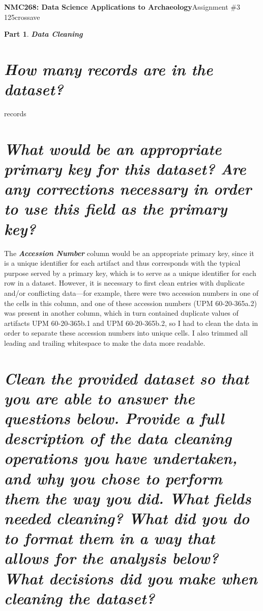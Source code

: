 \documentclass[answers]{exam}
\newtheorem{problem}{Part}
\begin{document}
\pagecolor{opp}
\noindent \textbf{NMC268: Data Science Applications to Archaeology}\hfill Assignment \#3\\
\color{nr}125crossave\color{black}

\hrulefill


\begin{problem}
\textbf{Data Cleaning}
\end{problem}
\begin{parts}
    \part{\textit{How many records are in the dataset?}}

   \color{nr}\quad{} records\color{black}
   \part{\textit{What would be an appropriate primary key for this dataset? Are any corrections necessary in order to use this field as the primary key?}}

   \color{nr}\quad\quad The \textit{\textbf{Accession Number}} column would be an appropriate primary key, since it is a unique identifier for each artifact and thus corresponds with the typical purpose served by a primary key, which is to serve as a unique identifier for each row in a dataset. However, it is necessary to first clean entries with duplicate and/or conflicting data---for example, there were two accession numbers in one of the cells in this column, and one of these accession numbers (UPM 60-20-365a.2) was present in another column, which in turn contained duplicate values of artifacts UPM 60-20-365b.1 and UPM 60-20-365b.2, so I had to clean the data in order to separate these accession numbers into unique cells. I also trimmed all leading and trailing whitespace to make the data more readable.

  \color{black} \part{\textit{Clean the provided dataset so that you are able to answer the questions below. Provide a full
description of the data cleaning operations you have undertaken, and why you chose to perform
them the way you did. What fields needed cleaning? What did you do to format them in a way
that allows for the analysis below? What decisions did you make when cleaning the dataset?}}


\end{parts}
\end{document}
